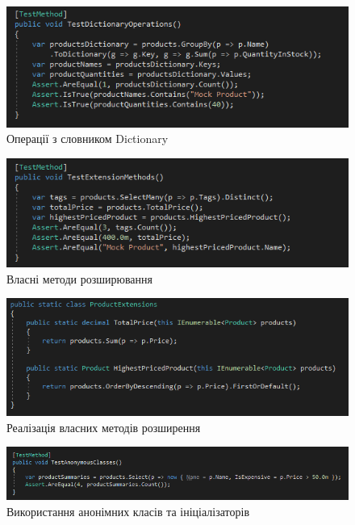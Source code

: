\documentclass[oneside,14pt]{extarticle}
\begin{document}
\begin{normalsize}
	\begin{figure}[H]
		\centering
		\includegraphics[width=\textwidth]{32}
		\caption{Операції з словником Dictionary}
	\end{figure}
	
	\begin{figure}[H]
		\centering
		\includegraphics[width=\textwidth]{4}
		\caption{Власні методи розширювання}
	\end{figure}
	
	\begin{figure}[H]
		\centering
		\includegraphics[width=\textwidth]{42}
		\caption{Реалізація власних методів розширення}
	\end{figure}
	
	\begin{figure}[H]
		\centering
		\includegraphics[width=\textwidth]{5}
		\caption{Використання анонімних класів та ініціалізаторів}
	\end{figure}
	

\end{normalsize}
\end{document}
